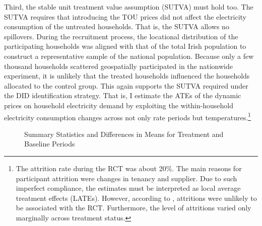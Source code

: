{Third, the stable unit treatment value assumption (SUTVA) must hold too. The SUTVA requires that introducing the TOU prices did not affect the electricity consumption of the untreated households. That is, the SUTVA allows no spillovers. During the recruitment process, the locational distribution of the participating households was aligned with that of the total Irish population to construct a representative sample of the national population. Because only a few thousand households scattered geospatially participated in the nationwide experiment, it is unlikely that the treated households influenced the households allocated to the control group. This again supports the SUTVA required under the DID identification strategy.} That is, I estimate the ATEs of the dynamic prices on household electricity demand by exploiting the within-household electricity consumption changes across not only rate periods but temperatures.\footnote{The attrition rate during the RCT was about 20\%. The main reasons for participant attrition were changes in tenancy and supplier. Due to such imperfect compliance, the estimates must be interpreted as local average treatment effects (LATEs). However, according to \cite{Electricity-Smart-Metering-Customer-Behaviour-Trials-Findings-Report_CER_2011}, attritions were unlikely to be associated with the RCT. Furthermore, the level of attritions varied only marginally across treatment status.}

\begin{figure}
\caption{Summary Statistics and Differences in Means for Treatment and Baseline Periods}
\label{Figure:Summary-Statistics-and-Differences-in-Means-for-Treatment-and-Baseline-Periods}
\end{figure}
